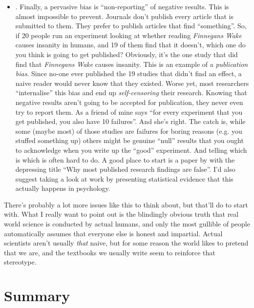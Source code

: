 \begin{itemize}
\item {}. Finally, a pervasive bias is ``non-reporting'' of negative results. This is almost impossible to prevent. Journals don't publish every article that is submitted to them. They prefer to publish articles that find ``something''. So, if 20 people run an experiment looking at whether reading {\it Finnegans Wake} causes insanity in humans, and 19 of them find that it doesn't, which one do you think is going to get published? Obviously, it's the one study that did find that {\it Finnegans Wake} causes insanity. This is an example of a {\it publication bias}. Since no-one ever published the 19 studies that didn't find an effect, a naive reader would never know that they existed. Worse yet, most researchers ``internalise'' this bias and end up {\it self-censoring} their research. Knowing that negative results aren't going to be accepted for publication, they never even try to report them. As a friend of mine says ``for every experiment that you get published, you also have 10 failures''. And she's right. The catch is, while some (maybe most) of those studies are failures for boring reasons (e.g. you stuffed something up) others might be genuine ``null'' results that you ought to acknowledge when you write up the ``good'' experiment. And telling which is which is often hard to do. A good place to start is a paper by \textcite{Ioannidis2005} with the depressing title ``Why most published research findings are false''. I'd also suggest taking a look at work by \textcite{Kuhberger2014} presenting statistical evidence that this actually happens in psychology.
\end{itemize}

There's probably a lot more issues like this to think about, but that'll do to start with. What I really want to point out is the blindingly obvious truth that real world science is conducted by actual humans, and only the most gullible of people automatically assumes that everyone else is honest and impartial. Actual scientists aren't usually {\it that} naive, but for some reason the world likes to pretend that we are, and the textbooks we usually write seem to reinforce that stereotype.

\section{Summary}

